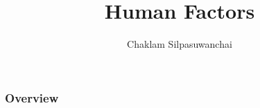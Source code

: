 \documentclass{beamer}
\title[Human Factors]{Human Factors} %
\author{Chaklam Silpasuwanchai} %
\institute[AIT] %
{
Asian Institute of Technology \\ %
\medskip
\textit{chaklam@ait.asia} %
}
\date{} %
\begin{document}
\begin{frame}
\titlepage %
\end{frame}

\begin{frame}
\frametitle{Overview} %
\tableofcontents %
\end{frame}



\end{document}
